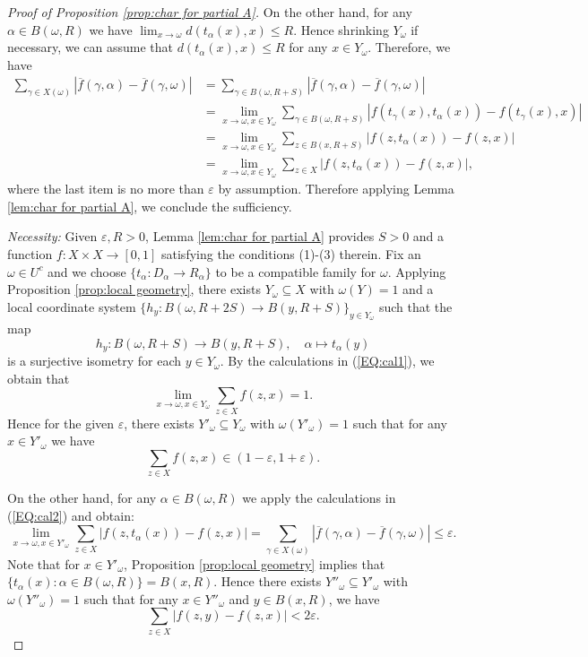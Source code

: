\documentclass[12pt, a4paper]{amsart}
\numberwithin{equation}{section}
\theoremstyle{definition}
\theoremstyle{remark}
\begin{document}
\begin{proof}[Proof of Proposition \ref{prop:char for partial A}]
On the other hand, for any $\alpha \in B(\omega, R)$ we have $\lim_{x\to \omega} d(t_\alpha(x),x) \leq R$. Hence shrinking $Y_\omega$ if necessary, we can assume that $d(t_\alpha(x),x) \leq R$ for any $x\in Y_\omega$. Therefore, we have
\begin{align}
\sum_{\gamma\in X(\omega)} |\overline{f}(\gamma, \alpha) - \overline{f}(\gamma, \omega)| &= \sum_{\gamma\in B(\omega, R+S)} |\overline{f}(\gamma, \alpha) - \overline{f}(\gamma, \omega)| \label{EQ:cal2}\\
&= \lim_{x\to \omega, x\in Y_\omega}\sum_{\gamma\in B(\omega, R+S)}  |f(t_\gamma(x), t_\alpha(x)) - f(t_\gamma(x), x)|\nonumber\\
&= \lim_{x\to \omega, x\in Y_\omega}\sum_{z\in B(x, R+S)}  |f(z, t_\alpha(x)) - f(z, x)| \nonumber\\
&= \lim_{x\to \omega, x\in Y_\omega}\sum_{z\in X}  |f(z, t_\alpha(x)) - f(z, x)|, \nonumber
\end{align}
where the last item is no more than $\varepsilon$ by assumption. Therefore applying Lemma \ref{lem:char for partial A}, we conclude the sufficiency.

\emph{Necessity:} Given $\varepsilon, R>0$, Lemma \ref{lem:char for partial A} provides $S>0$ and a function $f: X \times X \to [0,1]$ satisfying the conditions (1)-(3) therein. Fix an $\omega \in U^c$ and we choose $\{t_\alpha:D_\alpha \to R_\alpha\}$ to be a compatible family for $\omega$. Applying Proposition \ref{prop:local geometry}, there exists $Y_\omega \subseteq X$ with $\omega(Y)=1$ and a local coordinate system $\{h_y: B(\omega, R+2S) \to B(y,R+S)\}_{y\in Y_\omega}$ such that the map 
\[
h_y: B(\omega, R+S) \to B(y,R+S), \quad \alpha \mapsto t_\alpha(y)
\]
is a surjective isometry for each $y\in Y_\omega$. By the calculations in (\ref{EQ:cal1}), we obtain that
\[
\lim_{x\to \omega, x\in Y_\omega} \sum_{z\in X} f(z,x) =1.
\]
Hence for the given $\varepsilon$, there exists $Y'_\omega \subseteq Y_\omega$ with $\omega(Y'_\omega)=1$ such that for any $x\in Y'_\omega$ we have 
\[
\sum_{z\in X} f(z,x) \in (1-\varepsilon, 1+\varepsilon).
\]

On the other hand, for any $\alpha \in B(\omega, R)$ we apply the calculations in (\ref{EQ:cal2}) and obtain:
\[
\lim_{x\to \omega, x\in Y'_\omega}\sum_{z\in X}  |f(z, t_\alpha(x)) - f(z, x)| = \sum_{\gamma\in X(\omega)} |\overline{f}(\gamma, \alpha) - \overline{f}(\gamma, \omega)| \leq \varepsilon.
\]
Note that for $x\in Y'_\omega$, Proposition \ref{prop:local geometry} implies that $\{t_\alpha(x): \alpha \in B(\omega, R)\} = B(x,R)$. Hence there exists $Y''_\omega \subseteq Y'_\omega$ with $\omega(Y''_\omega)=1$ such that for any $x \in Y''_\omega$ and $y\in B(x,R)$, we have
\[
\sum_{z\in X}  |f(z, y) - f(z, x)| < 2\varepsilon.
\]


\end{proof}
\end{document}
